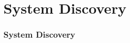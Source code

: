 \section{System Discovery}
\sectionframe
\begin{frame}
    \frametitle{System Discovery}
\end{frame}
